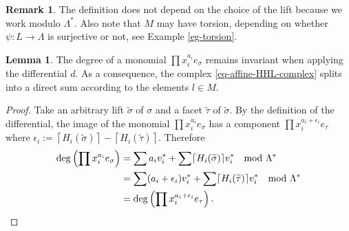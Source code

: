 \documentclass[11pt,reqno]{amsart}
\theoremstyle{definition}
\newtheorem{lemma}[theorem]{Lemma}
\newtheorem{remark}[theorem]{Remark}
\numberwithin{equation}{section}
\begin{document}
\begin{remark}
    The definition does not depend on the choice of the lift because we work modulo $\Lambda^*$. Also note that $M$ may have torsion, depending on whether $\psi: L\rightarrow \Lambda$ is surjective or not, see Example \ref{eg-torsion}.
\end{remark}




\begin{lemma}
    The degree of a monomial $\prod x_i^{a_i} e_{\sigma}$ remains invariant when applying the differential $d$. As a consequence, the complex \eqref{eq-affine-HHL-complex} splits into a direct sum according to the elements $l\in M$.
\end{lemma}
\begin{proof}
    Take an arbitrary lift $\widetilde{\sigma}$ of $\sigma$ and a facet $\widetilde{\tau}$ of $\widetilde{\sigma}$. By the definition of the differential, the image of the monomial $\prod x_i^{a_i} e_{\sigma}$ has a component $\prod x_i^{a_i+\epsilon_i} e_{\tau}$ where $\epsilon_{i}:=\left\lceil H_{i}(\widetilde{\sigma})  \right\rceil - \left\lceil H_{i}(\widetilde{\tau})  \right\rceil $. Therefore 
    \begin{align*}
    \deg\left(\prod x_i^{a_i} e_{\sigma}\right) &= \sum a_i v_i^* + \sum \lceil H_i(\widetilde{\sigma}) \rceil v_i^* \  \mod\Lambda^* \\
    &=  \sum (a_i+\epsilon_i) v_i^* + \sum \lceil H_i(\widetilde{\tau}) \rceil v_i^* \  \mod\Lambda^* \\
    &= \deg\left(\prod x_i^{a_i+\epsilon_i} e_{\tau}\right). \qedhere
    \end{align*}
\end{proof}

\smallskip
\end{document}
